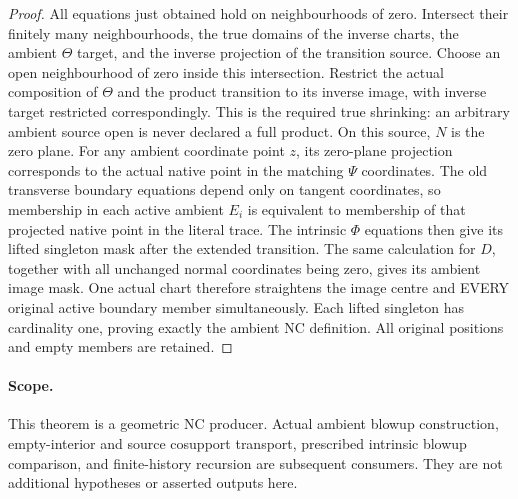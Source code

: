 \begin{proof}
All equations just obtained hold on neighbourhoods of zero. Intersect their
finitely many neighbourhoods, the true domains of the inverse charts, the
ambient $\Theta$ target, and the inverse projection of the transition source.
Choose an open neighbourhood of zero inside this intersection. Restrict the
actual composition of $\Theta$ and the product transition to its inverse
image, with inverse target restricted correspondingly. This is the required
true shrinking: an arbitrary ambient source open is never declared a full
product. On this source, $N$ is the zero plane. For any ambient coordinate
point $z$, its zero-plane projection corresponds to the actual native point
in the matching $\Psi$ coordinates. The old transverse boundary equations
depend only on tangent coordinates, so membership in each active ambient
$E_i$ is equivalent to membership of that projected native point in the
literal trace. The intrinsic $\Phi$ equations then give its lifted singleton
mask after the extended transition. The same calculation for $D$, together
with all unchanged normal coordinates being zero, gives its ambient image
mask. One actual chart therefore straightens the image centre and EVERY
original active boundary member simultaneously. Each lifted singleton has
cardinality one, proving exactly the ambient NC definition. All original
positions and empty members are retained.
\end{proof}

\paragraph{Scope.} This theorem is a geometric NC producer. Actual ambient
blowup construction, empty-interior and source cosupport transport, prescribed
intrinsic blowup comparison, and finite-history recursion are subsequent
consumers. They are not additional hypotheses or asserted outputs here.
